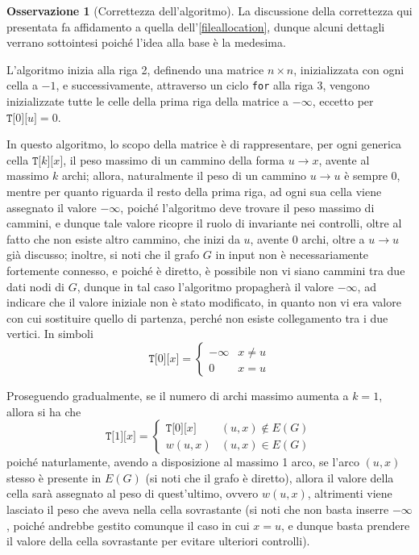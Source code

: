 \documentclass[14pt]{extreport}
\theoremstyle{definition}
\theoremstyle{definition}
\newtheorem{remark}{Osservazione}[subsection]
\begin{document}
\begin{remark}[Correttezza dell'algoritmo]
    La discussione della correttezza qui presentata fa affidamento a quella dell'\cref{fileallocation}, dunque alcuni dettagli verrano sottointesi poiché l'idea alla base è la medesima.

    L'algoritmo inizia alla riga 2, definendo una matrice $n \times n$, inizializzata con ogni cella a $-1$, e successivamente, attraverso un ciclo \texttt{for} alla riga 3, vengono inizializzate tutte le celle della prima riga della matrice a $- \infty$, eccetto per $\texttt{T[}0\texttt{][}u\texttt{]}=0$.

    In questo algoritmo, lo scopo della matrice è di rappresentare, per ogni generica cella $\texttt{T[}k\texttt{][}x\texttt{]}$, il peso massimo di un cammino della forma $u \rightarrow x$, avente al massimo $k$ archi; allora, naturalmente il peso di un cammino $u \rightarrow u$ è sempre 0, mentre per quanto riguarda il resto della prima riga, ad ogni sua cella viene assegnato il valore $- \infty$, poiché l'algoritmo deve trovare il peso massimo di cammini, e dunque tale valore ricopre il ruolo di invariante nei controlli, oltre al fatto che non esiste altro cammino, che inizi da $u$, avente 0 archi, oltre a $u \rightarrow u$ già discusso; inoltre, si noti che il grafo $G$ in input non è necessariamente fortemente connesso, e poiché è diretto, è possibile non vi siano cammini tra due dati nodi di $G$, dunque in tal caso l'algoritmo propagherà il valore $- \infty$, ad indicare che il valore iniziale non è stato modificato, in quanto non vi era valore con cui sostituire quello di partenza, perché non esiste collegamento tra i due vertici. In simboli $$\texttt{T[}0\texttt{][}x\texttt{]} = \left \{ \begin{array}{ll} - \infty & x \neq u \\ 0 & x = u \end{array} \right.$$

    Proseguendo gradualmente, se il numero di archi massimo aumenta a $k =1$, allora si ha che $$\texttt{T[}1\texttt{][}x\texttt{]} = \left \{ \begin{array}{ll} \texttt{T[}0\texttt{][}x\texttt{]} & (u, x) \notin E(G) \\ w(u, x) & (u, x) \in E(G) \end{array} \right .$$ poiché naturlamente, avendo a disposizione al massimo 1 arco, se l'arco $(u, x)$ stesso è presente in $E(G)$ (si noti che il grafo è diretto), allora il valore della cella sarà assegnato al peso di quest'ultimo, ovvero $w(u, x)$, altrimenti viene lasciato il peso che aveva nella cella sovrastante (si noti che non basta inserre $- \infty$, poiché andrebbe gestito comunque il caso in cui $x = u$, e dunque basta prendere il valore della cella sovrastante per evitare ulteriori controlli).


\end{remark}
\end{document}
